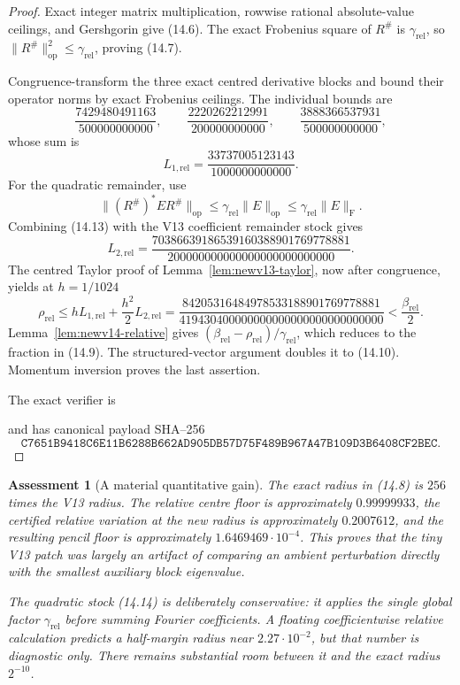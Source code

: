 \documentclass[11pt,oneside]{article}
\newtheorem{assessment}[theorem]{Assessment}
\theoremstyle{definition}
\theoremstyle{remark}
\begin{document}
\begin{proof}
Exact integer matrix multiplication, rowwise rational absolute-value
ceilings, and Gershgorin give (14.6).  The exact Frobenius square of
\(R^\#\) is \(\gamma_{\mathrm{rel}}\), so
\(\|R^\#\|_{\mathrm{op}}^2\le\gamma_{\mathrm{rel}}\), proving
(14.7).

Congruence-transform the three exact centred derivative blocks and
bound their operator norms by exact Frobenius ceilings.  The
individual bounds are
\[
 \frac{7429480491163}{500000000000},\qquad
 \frac{2220262212991}{200000000000},\qquad
 \frac{3888366537931}{500000000000},                     \tag{14.11}
\]
whose sum is
\[
 L_{1,\mathrm{rel}}
 =\frac{33737005123143}{1000000000000}.                  \tag{14.12}
\]
For the quadratic remainder, use
\[
 \|(R^\#)^*ER^\#\|_{\mathrm{op}}
 \le\gamma_{\mathrm{rel}}\|E\|_{\mathrm{op}}
 \le\gamma_{\mathrm{rel}}\|E\|_{\mathrm F}.              \tag{14.13}
\]
Combining (14.13) with the V13 coefficient remainder stock gives
\[
 L_{2,\mathrm{rel}}
 =
 \frac{70386639186539160388901769778881}
 {200000000000000000000000000}.                          \tag{14.14}
\]
The centred Taylor proof of Lemma~\ref{lem:newv13-taylor}, now after
congruence, yields at \(h=1/1024\)
\[
 \rho_{\mathrm{rel}}
 \le hL_{1,\mathrm{rel}}+\frac{h^2}{2}L_{2,\mathrm{rel}}
 =
 \frac{84205316484978533188901769778881}
 {419430400000000000000000000000000}
 <\frac{\beta_{\mathrm{rel}}}{2}.                         \tag{14.15}
\]
Lemma~\ref{lem:newv14-relative} gives
\((\beta_{\mathrm{rel}}-\rho_{\mathrm{rel}})
 /\gamma_{\mathrm{rel}}\), which reduces to the fraction in (14.9).
The structured-vector argument doubles it to (14.10).
Momentum inversion proves the last assertion.

The exact verifier is
\begin{center}
\footnotesize
{}
\end{center}
and has canonical payload SHA--256
\[
\texttt{C7651B9418C6E11B6288B662AD905DB57D75F489B967A47B109D3B6408CF2BEC}.
                                                               \tag{14.16}
\]
\end{proof}

\begin{assessment}[A material quantitative gain]
\label{ass:newv14-gain}
The exact radius in (14.8) is \(256\) times the V13 radius.  The
relative centre floor is approximately \(0.99999933\), the certified
relative variation at the new radius is approximately \(0.2007612\),
and the resulting pencil floor is approximately
\(1.6469469\cdot10^{-4}\).  This proves that the tiny V13 patch was
largely an artifact of comparing an ambient perturbation directly
with the smallest auxiliary block eigenvalue.

The quadratic stock (14.14) is deliberately conservative: it applies
the single global factor \(\gamma_{\mathrm{rel}}\) before summing
Fourier coefficients.  A floating coefficientwise relative
calculation predicts a half-margin radius near \(2.27\cdot10^{-2}\),
but that number is diagnostic only.  There remains substantial room
between it and the exact radius \(2^{-10}\).
\end{assessment}
\end{document}
